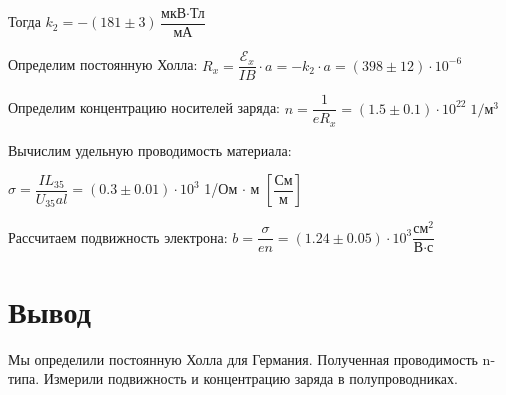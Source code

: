 \documentclass[a4paper, 12pt]{article}
\begin{document}
Тогда  $k_2	 = -(181 \pm 3) \dfrac{\text{мкВ} \cdot \text{Тл}}{\text{мА}}$

Определим постоянную Холла: $R_x = \dfrac{\mathscr{E}_x}{IB} \cdot a = - k_2 \cdot a = (398 \pm 12) \cdot 10^{-6}\; \text{}$

Определим концентрацию носителей заряда: $n = \dfrac{1}{eR_x} = (1.5 \pm 0.1) \cdot 10^{22} \; 1/\text{м}^3$
	
Вычислим удельную проводимость материала: 

$\sigma = \dfrac{I L_{35}}{U_{35} al} = (0.3 \pm 0.01) \cdot 10^3 $ 1/Ом $\cdot$ м  $\left[ \dfrac{\text{См}}{\text{м}} \right]$

Рассчитаем подвижность электрона:
$b = \dfrac{\sigma}{en} = (1.24 \pm 0.05) \cdot 10^3 \dfrac{\text{см}^2}{\text{В} \cdot \text{с}}$

\section{Вывод}

Мы определили постоянную Холла для Германия. Полученная проводимость n-типа. Измерили подвижность и концентрацию заряда в полупроводниках.
\end{document}
